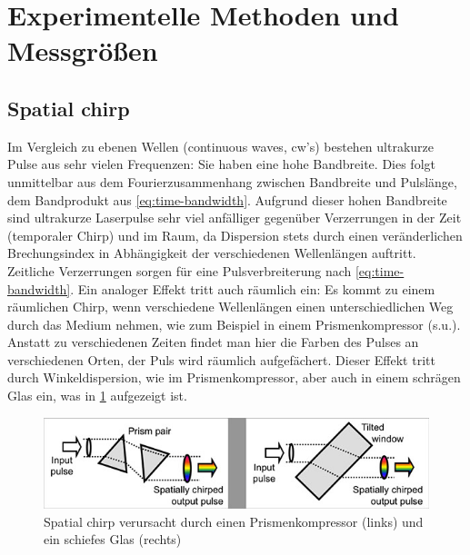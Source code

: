 \documentclass[twoside,        %
               BCOR12mm,       %
               english,ngerman, %
               fleqn,headsepline=false,footsepline=false
              ]{Vorlage/MFPREPORT}
\begin{document}
\section{Experimentelle Methoden und Messgrößen}
\subsection{Spatial chirp}
Im Vergleich zu ebenen Wellen (continuous waves, cw's) bestehen ultrakurze
Pulse aus
sehr vielen Frequenzen: Sie haben eine hohe Bandbreite. Dies folgt unmittelbar
aus dem Fourierzusammenhang zwischen Bandbreite und Pulslänge, dem Bandprodukt
aus
\cref{eq:time-bandwidth}. Aufgrund dieser hohen Bandbreite sind ultrakurze
Laserpulse sehr viel anfälliger gegenüber Verzerrungen in der Zeit (temporaler
Chirp) und im Raum, da Dispersion stets durch einen veränderlichen
Brechungsindex in Abhängigkeit der verschiedenen Wellenlängen auftritt.
Zeitliche Verzerrungen sorgen für eine Pulsverbreiterung nach
\cref{eq:time-bandwidth}. Ein analoger Effekt tritt auch räumlich ein: Es kommt zu
einem räumlichen Chirp, wenn verschiedene Wellenlängen einen unterschiedlichen
Weg durch das Medium nehmen, wie zum Beispiel in einem Prismenkompressor
(s.u.). Anstatt zu verschiedenen Zeiten findet man hier die Farben des Pulses
an verschiedenen Orten, der Puls wird räumlich aufgefächert. Dieser Effekt
tritt durch Winkeldispersion, wie im Prismenkompressor, aber auch in einem
schrägen Glas ein, was in \cref{fig:spatialchirp} aufgezeigt ist.
\begin{figure}[]
    \centering
    \includegraphics[width=\textwidth]{spatialchirp.png}
    \caption{Spatial chirp verursacht durch einen Prismenkompressor (links) und
        ein schiefes Glas (rechts) \cite{tutspatialchirp}}
    \label{fig:spatialchirp}
\end{figure}
\end{document}
